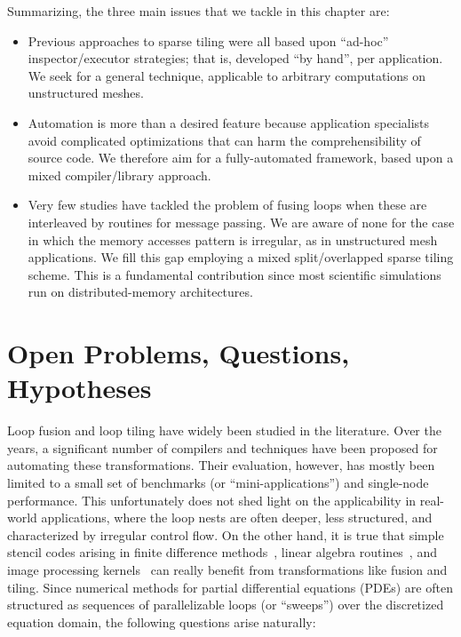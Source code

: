 Summarizing, the three main issues that we tackle in this chapter are:

\begin{itemize}
\item Previous approaches to sparse tiling were all based upon ``ad-hoc'' inspector/executor strategies; that is, developed ``by hand'', per application. We seek for a general technique, applicable to arbitrary computations on unstructured meshes.
\item Automation is more than a desired feature because application specialists avoid complicated optimizations that can harm the comprehensibility of source code. We therefore aim for a fully-automated framework, based upon a mixed compiler/library approach.
\item Very few studies have tackled the problem of fusing loops when these are interleaved by routines for message passing. We are aware of none for the case in which the memory accesses pattern is irregular, as in unstructured mesh applications. We fill this gap employing a mixed split/overlapped sparse tiling scheme. This is a fundamental contribution since most scientific simulations run on distributed-memory architectures.
\end{itemize}

\section{Open Problems, Questions, Hypotheses}
\label{sec:tiling:struct}
Loop fusion and loop tiling have widely been studied in the literature. Over the years, a significant number of compilers and techniques have been proposed for automating these transformations. Their evaluation, however, has mostly been limited to a small set of benchmarks (or ``mini-applications'') and single-node performance. This unfortunately does not shed light on the applicability in real-world applications, where the loop nests are often deeper, less structured, and characterized by irregular control flow. On the other hand, it is true that simple stencil codes arising in finite difference methods~\citep{vect-tiled-ho-fd,ics-stencil-tiling,cohen-timetiling}, linear algebra routines~\citep{qr-fact-tiled,blas-tiling}, and image processing kernels~\citep{Halide} can really benefit from transformations like fusion and tiling. Since numerical methods for partial differential equations (PDEs) are often structured as sequences of parallelizable loops (or ``sweeps'') over the discretized equation domain, the following questions arise naturally: 

